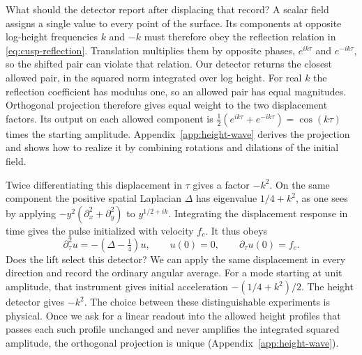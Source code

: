\documentclass[11pt,letterpaper]{article}
\numberwithin{equation}{section}
\begin{document}
What should the detector report after displacing that record? A scalar field assigns a single value to every point of the surface. Its components at opposite log-height frequencies $k$ and $-k$ must therefore obey the reflection relation in \eqref{eq:cusp-reflection}. Translation multiplies them by opposite phases, $e^{ik\tau}$ and $e^{-ik\tau}$, so the shifted pair can violate that relation. Our detector returns the closest allowed pair, in the squared norm integrated over log height. For real $k$ the reflection coefficient has modulus one, so an allowed pair has equal magnitudes. Orthogonal projection therefore gives equal weight to the two displacement factors. Its output on each allowed component is $\tfrac12(e^{ik\tau}+e^{-ik\tau})=\cos(k\tau)$ times the starting amplitude. Appendix~\ref{app:height-wave} derives the projection and shows how to realize it by combining rotations and dilations of the initial field.

Twice differentiating this displacement in $\tau$ gives a factor $-k^2$. On the same component the positive spatial Laplacian $\Delta$ has eigenvalue $1/4+k^2$, as one sees by applying $-y^2(\partial_x^2+\partial_y^2)$ to $y^{1/2+ik}$. Integrating the displacement response in time gives the pulse initialized with velocity $f_c$. It thus obeys
\begin{equation}
 \partial_\tau^2 u=-(\Delta-\tfrac14)u,\qquad
 u(0)=0,\qquad \partial_\tau u(0)=f_c .
 \label{eq:height-wave}
\end{equation}
Does the lift select this detector? We can apply the same displacement in every direction and record the ordinary angular average. For a mode starting at unit amplitude, that instrument gives initial acceleration $-(1/4+k^2)/2$. The height detector gives $-k^2$. The choice between these distinguishable experiments is physical. Once we ask for a linear readout into the allowed height profiles that passes each such profile unchanged and never amplifies the integrated squared amplitude, the orthogonal projection is unique (Appendix~\ref{app:height-wave}).
\end{document}
